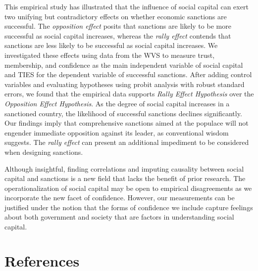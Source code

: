 \documentclass[
  english,
  man]{apa6}
\begin{document}
This empirical study has illustrated that the influence of social capital can exert two unifying but contradictory effects on whether economic sanctions are successful. The \emph{opposition effect} posits that sanctions are likely to be more successful as social capital increases, whereas the \emph{rally effect} contends that sanctions are less likely to be successful as social capital increases. We investigated these effects using data from the WVS to measure trust, membership, and confidence as the main independent variable of social capital and TIES for the dependent variable of successful sanctions. After adding control variables and evaluating hypotheses using probit analysis with robust standard errors, we found that the empirical data supports \emph{Rally Effect Hypothesis} over the \emph{Opposition Effect Hypothesis}. As the degree of social capital increases in a sanctioned country, the likelihood of successful sanctions declines significantly. Our findings imply that comprehensive sanctions aimed at the populace will not engender immediate opposition against its leader, as conventional wisdom suggests. The \emph{rally effect} can present an additional impediment to be considered when designing sanctions.

Although insightful, finding correlations and imputing causality between social capital and sanctions is a new field that lacks the benefit of prior research. The operationalization of social capital may be open to empirical disagreements as we incorporate the new facet of confidence. However, our measurements can be justified under the notion that the forms of confidence we include capture feelings about both government and society that are factors in understanding social capital.

\newpage

\hypertarget{references}{%
\section{References}\label{references}}

\begingroup
\setlength{\parindent}{-0.5in}
\setlength{\leftskip}{0.5in}
\end{document}
